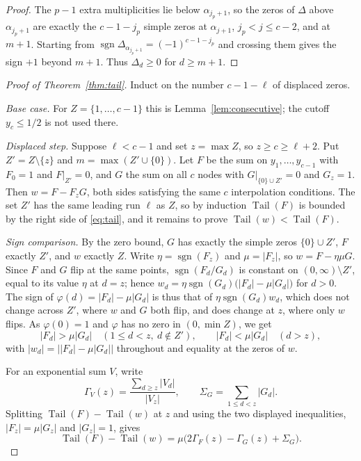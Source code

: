 \documentclass[11pt]{article}
\DeclareMathOperator{\Tail}{Tail}
\DeclareMathOperator{\sgn}{sgn}
\begin{document}
\begin{proof}
The $p-1$ extra multiplicities lie below $\alpha_{j_p+1}$, so the zeros of
$\Delta$ above $\alpha_{j_p+1}$ are exactly the $c-1-j_p$ simple zeros at
$\alpha_{j+1}$, $j_p<j\le c-2$, and at $m+1$.  Starting from
$\sgn\Delta_{\alpha_{j_p+1}}=(-1)^{c-1-j_p}$ and crossing them gives the sign
$+1$ beyond $m+1$.  Thus $\Delta_d\ge0$ for $d\ge m+1$.
\end{proof}

\begin{proof}[Proof of Theorem~\ref{thm:tail}]
Induct on the number $c-1-\ell$ of displaced zeros.

\emph{Base case.}  For $Z=\{1,\ldots,c-1\}$ this is
Lemma~\ref{lem:consecutive}; the cutoff $y_c\le1/2$ is not used there.

\emph{Displaced step.}  Suppose $\ell<c-1$ and set $z=\max Z$, so
$z\ge c\ge\ell+2$.  Put $Z'=Z\setminus\{z\}$ and $m=\max(Z'\cup\{0\})$.  Let
$F$ be the sum on $y_1,\ldots,y_{c-1}$ with $F_0=1$ and $F|_{Z'}=0$, and $G$
the sum on all $c$ nodes with $G|_{\{0\}\cup Z'}=0$ and $G_z=1$.  Then
$w=F-F_zG$, both sides satisfying the same $c$ interpolation conditions.
The set $Z'$ has the same leading run $\ell$ as $Z$, so by induction
$\Tail(F)$ is bounded by the right side of \eqref{eq:tail}, and it remains
to prove $\Tail(w)<\Tail(F)$.

\emph{Sign comparison.}  By the zero bound, $G$ has exactly the simple zeros
$\{0\}\cup Z'$, $F$ exactly $Z'$, and $w$ exactly $Z$.  Write
$\eta=\sgn(F_z)$ and $\mu=|F_z|$, so $w=F-\eta\mu G$.  Since $F$ and $G$ flip
at the same points, $\sgn(F_d/G_d)$ is constant on $(0,\infty)\setminus Z'$,
equal to its value $\eta$ at $d=z$; hence
$w_d=\eta\sgn(G_d)\bigl(|F_d|-\mu|G_d|\bigr)$ for $d>0$.  The sign of
$\varphi(d)=|F_d|-\mu|G_d|$ is thus that of $\eta\sgn(G_d)w_d$, which does
not change across $Z'$, where $w$ and $G$ both flip, and does change at $z$,
where only $w$ flips.  As $\varphi(0)=1$ and $\varphi$ has no zero in
$(0,\min Z)$, we get
\[
  |F_d|>\mu|G_d|\quad(1\le d<z,\ d\notin Z'),
  \qquad
  |F_d|<\mu|G_d|\quad(d>z),
\]
with $|w_d|=\bigl||F_d|-\mu|G_d|\bigr|$ throughout and equality at the
zeros of $w$.

For an exponential sum $V$, write
\[
  \Gamma_V(z)=\frac{\sum_{d\ge z}|V_d|}{|V_z|},
  \qquad \Sigma_G=\sum_{1\le d<z}|G_d|.
\]
Splitting $\Tail(F)-\Tail(w)$ at $z$ and using the two displayed
inequalities, $|F_z|=\mu|G_z|$ and $|G_z|=1$, gives
\begin{equation}\label{eq:split}
  \Tail(F)-\Tail(w)
  =\mu\bigl(2\Gamma_F(z)-\Gamma_G(z)+\Sigma_G\bigr).
\end{equation}


\end{proof}
\end{document}

